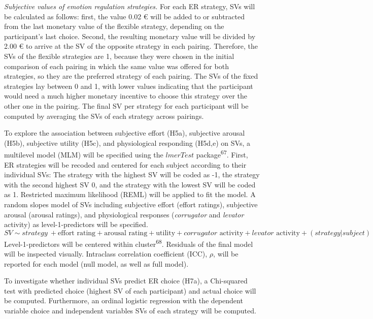 \documentclass[
  english,
  man,floatsintext]{apa6}
\begin{document}
\emph{Subjective values of emotion regulation strategies.} For each ER strategy, SVs will be calculated as follows: first, the value 0.02 € will be added to or subtracted from the last monetary value of the flexible strategy, depending on the participant's last choice.
Second, the resulting monetary value will be divided by 2.00 € to arrive at the SV of the opposite strategy in each pairing.
Therefore, the SVs of the flexible strategies are 1, because they were chosen in the initial comparison of each pairing in which the same value was offered for both strategies, so they are the preferred strategy of each pairing.
The SVs of the fixed strategies lay between 0 and 1, with lower values indicating that the participant would need a much higher monetary incentive to choose this strategy over the other one in the pairing.
The final SV per strategy for each participant will be computed by averaging the SVs of each strategy across pairings.

To explore the association between subjective effort (H5a), subjective arousal (H5b), subjective utility (H5c), and physiological responding (H5d,e) on SVs, a multilevel model (MLM) will be specified using the \(lmerTest\) package\textsuperscript{67}.
First, ER strategies will be recoded and centered for each subject according to their individual SVs: The strategy with the highest SV will be coded as -1, the strategy with the second highest SV 0, and the strategy with the lowest SV will be coded as 1.
Restricted maximum likelihood (REML) will be applied to fit the model.
A random slopes model of SVs including subjective effort (effort ratings), subjective arousal (arousal ratings), and physiological responses (\emph{corrugator} and \emph{levator} activity) as level-1-predictors will be specified.
\[
SV \sim strategy\ + \text{effort rating} + \text{arousal rating} + \text{utility} + corrugator \text{ activity} + levator \text{ activity} + (strategy|subject)
\]
Level-1-predictors will be centered within cluster\textsuperscript{68}.
Residuals of the final model will be inspected visually.
Intraclass correlation coefficient (ICC), \(\rho\), will be reported for each model (null model, as well as full model).

To investigate whether individual SVs predict ER choice (H7a), a Chi-squared test with predicted choice (highest SV of each participant) and actual choice will be computed.
Furthermore, an ordinal logistic regression with the dependent variable choice and independent variables SVs of each strategy will be computed.
\end{document}
